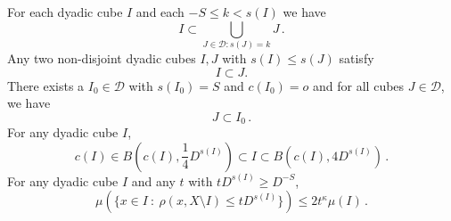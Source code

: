 \documentclass[10pt,a4paper]{article}
\theoremstyle{plain}
\theoremstyle{definition}
\numberwithin{equation}{subsection}
\begin{document}
For each dyadic cube $I$ and each $-S\le k<s(I)$ we have
\begin{equation}\label{coverdyadic}
    I\subset \bigcup_{J\in \mathcal {D}: s(J)=k}J\, .
\end{equation}
Any two non-disjoint dyadic cubes $I,J$ with $s(I)\le s(J)$ satisfy
\begin{equation}\label{dyadicproperty}
    I\subset J.
\end{equation}
There exists a $I_0 \in \mathcal{D}$ with $s(I_0) = S$ and $c(I_0) = o$
and for all cubes $J \in \mathcal{D}$, we have
\begin{equation}\label{subsetmaxcube}
    J \subset I_0\,.
\end{equation}
For any dyadic cube $I$,
\begin{equation}
    \label{eq-vol-sp-cube}
    c(I)\in B(c(I), \frac{1}{4} D^{s(I)}) \subset I \subset B(c(I), 4 D^{s(I)})\,.
\end{equation}
For any dyadic cube $I$ and any $t$ with $tD^{s(I)} \ge D^{-S}$,
\begin{equation}
    \label{eq-small-boundary}
    \mu(\{x \in I \ : \ \rho(x, X \setminus I) \leq t D^{s(I)}\}) \le 2 t^\kappa \mu(I)\,.
\end{equation}
\end{document}
